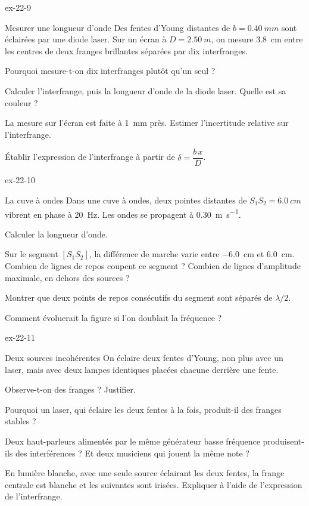 \begin{blocLivre}{ex-22-9}
\begin{exercice}[2]{Mesurer une longueur d'onde}
Des fentes d'Young distantes de $b=\qty{0,40}{mm}$ sont éclairées par une diode laser. Sur un écran à $D=\qty{2,50}{m}$, on
mesure \qty{3,8}{cm} entre les centres de deux franges brillantes séparées par dix interfranges.
\begin{questions}
\item Pourquoi mesure-t-on dix interfranges plutôt qu'un seul ?
\item Calculer l'interfrange, puis la longueur d'onde de la diode laser. Quelle est sa couleur ?
\item La mesure sur l'écran est faite à \qty{1}{mm} près. Estimer l'incertitude relative sur l'interfrange.
\item Établir l'expression de l'interfrange à partir de $\delta=\dfrac{b\,x}{D}$.
\end{questions}
\end{exercice}
\end{blocLivre}
\begin{blocLivre}{ex-22-10}
\begin{exercice}[2]{La cuve à ondes}
Dans une cuve à ondes, deux pointes distantes de $S_1S_2=\qty{6,0}{cm}$ vibrent en phase à \qty{20}{Hz}. Les ondes se propagent
à \qty{0,30}{m.s^{-1}}.
\begin{questions}
\item Calculer la longueur d'onde.
\item Sur le segment $[S_1S_2]$, la différence de marche varie entre \qty{-6,0}{cm} et \qty{6,0}{cm}. Combien de lignes de
repos coupent ce segment ? Combien de lignes d'amplitude maximale, en dehors des sources ?
\item Montrer que deux points de repos consécutifs du segment sont séparés de $\lambda/2$.
\item Comment évoluerait la figure si l'on doublait la fréquence ?
\end{questions}
\end{exercice}
\end{blocLivre}
\begin{blocLivre}{ex-22-11}
\begin{exercice}[2]{Deux sources incohérentes}
On éclaire deux fentes d'Young, non plus avec un laser, mais avec deux lampes identiques placées chacune derrière une
fente.
\begin{questions}
\item Observe-t-on des franges ? Justifier.
\item Pourquoi un laser, qui éclaire les deux fentes à la fois, produit-il des franges stables ?
\item Deux haut-parleurs alimentés par le même générateur basse fréquence produisent-ils des interférences ? Et deux
musiciens qui jouent la même note ?
\item En lumière blanche, avec une seule source éclairant les deux fentes, la frange centrale est blanche et les
suivantes sont irisées. Expliquer à l'aide de l'expression de l'interfrange.
\end{questions}
\end{exercice}
\end{blocLivre}
